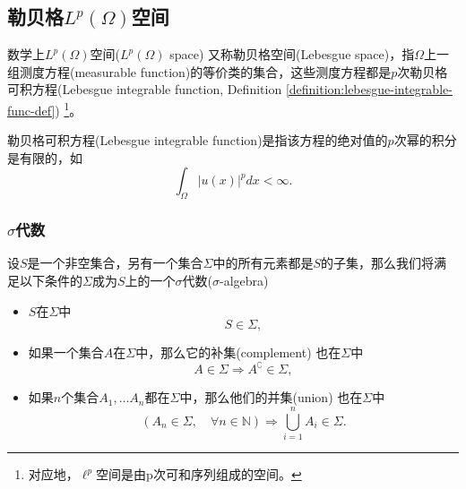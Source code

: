 \subsection{勒贝格\texorpdfstring{$L^p(\Omega)$}{(LP)}空间}

数学上$L^{p}(\Omega)$空间($L^{p}(\Omega)$ space) 又称勒贝格空间(Lebesgue space)，指$\Omega$上一组测度方程(measurable function)的等价类的集合，这些测度方程都是$p$次勒贝格可积方程(Lebesgue integrable function, Definition \ref{definition:lebesgue-integrable-func-def}) \footnote{对应地，$\ell^p$空间是由p次可和序列组成的空间。}。

\begin{definition}[勒贝格可积方程]
  \label{definition:lebesgue-integrable-func-def}
  勒贝格可积方程(Lebesgue integrable function)是指该方程的绝对值的$p$次幂的积分是有限的，如
  \begin{equation*}
    \int_{\Omega} \left| u(x) \right|^p d x < \infty.
  \end{equation*}
\end{definition}

\subsubsection{\texorpdfstring{$\sigma$}{SIGMA}代数}
\begin{definition}[sigma代数]
  \label{definition:measure-sigma-algebra}
设$S$是一个非空集合，另有一个集合$\Sigma$中的所有元素都是$S$的子集，那么我们将满足以下条件的$\Sigma$成为$S$上的一个$\sigma$代数($\sigma$-algebra) \citep[p.4]{Bogachev:2007wh, Bogachev:2007tn}
\begin{itemize}
  \item $S$在$\Sigma$中
  \begin{equation*}
    S \in \Sigma,
  \end{equation*}
  \item 如果一个集合$A$在$\Sigma$中，那么它的补集(complement) 也在$\Sigma$中
  \begin{equation*}
    A \in \Sigma \Rightarrow A^{\complement} \in \Sigma,
  \end{equation*}
  \item 如果$n$个集合$A_1, \ldots A_n$都在$\Sigma$中，那么他们的并集(union) 也在$\Sigma$中
  \begin{equation*}
    \left( A_n \in \Sigma , \quad  \forall n \in \mathbb{N} \right)
    \Rightarrow \bigcup_{i=1}^{n} A_{i} \in \Sigma.
  \end{equation*}
\end{itemize}
\end{definition}

